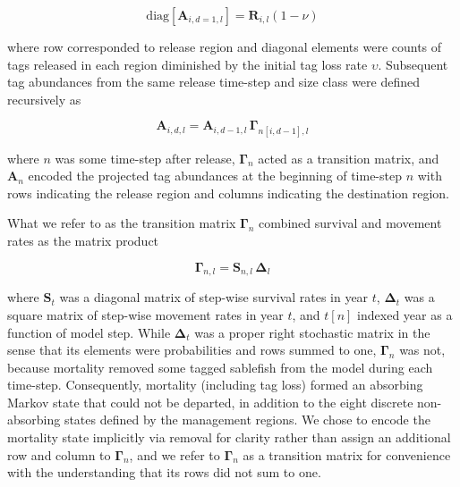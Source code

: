 \documentclass{article}
\begin{document}
\begin{equation}
  \label{eq:abundance-initial}
  \mathrm{diag} \! \left[\boldsymbol{A}_{i,d=1,l}\right] = \boldsymbol{R}_{i,l} \left(1 - \nu \right)
\end{equation}


where row corresponded to release region and diagonal elements were counts of tags released in each region diminished by the initial tag loss rate $\upsilon$. Subsequent tag abundances from the same release time-step and size class were defined recursively as 

\begin{equation}
    \label{eq:abundance}
    \boldsymbol{A}_{i,d,l} = \boldsymbol{A}_{i,d-1,l} \, \boldsymbol{\Gamma}_{n[i,d-1],l}
\end{equation}

\noindent where $n$ was some time-step after release, $\boldsymbol{\Gamma}_n$ acted as a transition matrix, and $\boldsymbol{A}_n$ encoded the projected tag abundances at the beginning of time-step $n$ with rows indicating the release region and columns indicating the destination region. 

What we refer to as the transition matrix $\boldsymbol{\Gamma}_n$ combined survival and movement rates as the matrix product

\begin{equation}
    \label{eq:transition}
    \boldsymbol{\Gamma}_{n,l} = \boldsymbol{S}_{n,l} \, \boldsymbol{\Delta}_{l}
\end{equation}

\noindent where $\boldsymbol{S}_t$ was a diagonal matrix of step-wise survival rates in year $t$, $\boldsymbol{\Delta}_t$ was a square matrix of step-wise movement rates in year $t$, and $t[n]$ indexed year as a function of model step. While $\boldsymbol{\Delta}_t$ was a proper right stochastic matrix in the sense that its elements were probabilities and rows summed to one, $\boldsymbol{\Gamma}_n$ was not, because mortality removed some tagged sablefish from the model during each time-step. Consequently, mortality (including tag loss) formed an absorbing Markov state that could not be departed, in addition to the eight discrete non-absorbing states defined by the management regions. We chose to encode the mortality state implicitly via removal for clarity rather than assign an additional row and column to $\boldsymbol{\Gamma}_n$, and we refer to $\boldsymbol{\Gamma}_n$ as a transition matrix for convenience with the understanding that its rows did not sum to one.
\end{document}

